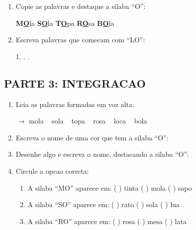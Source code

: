 \begin{exercicio}
\begin{enumerate}[resume]
  \item Copie as palavras e destaque a silaba ``O'':
  \begin{center}
  \textbf{M}\underline{\textbf{O}}la \quad \textbf{S}\underline{\textbf{O}}la \quad \textbf{T}\underline{\textbf{O}}pa \quad \textbf{R}\underline{\textbf{O}}sa \quad \textbf{B}\underline{\textbf{O}}la
  \end{center}

  \item Escreva palavras que comecam com ``LO'':
  \begin{center}
  1. \underline{\hspace{3cm}} . \underline{\hspace{3cm}} . \underline{\hspace{3cm}}
  \end{center}
\end{enumerate}

\subsection*{PARTE 3: INTEGRACAO}

\begin{enumerate}[resume]
  \item Leia as palavras formadas em voz alta:
  \begin{center}
  $\rightarrow$ mola  ~  sola  ~  topa  ~  rosa  ~  loca  ~  bola
  \end{center}

  \item Escreva o nome de uma cor que tem a silaba ``O'':
  \begin{center}
  \underline{\hspace{6cm}}
  \end{center}

  \item Desenhe algo e escreva o nome, destacando a silaba ``O'':
  \begin{center}
  \end{center}

  \item Circule a opcao correta:
  \begin{enumerate}[label=(\alph*)]
    \item A silaba ``MO'' aparece em: ( ) tinta ( ) mola ( ) sapo
    \item A silaba ``SO'' aparece em: ( ) rato ( ) sola ( ) lua
    \item A silaba ``RO'' aparece em: ( ) rosa ( ) mesa ( ) lata
  \end{enumerate}


\end{enumerate}
\end{exercicio}
